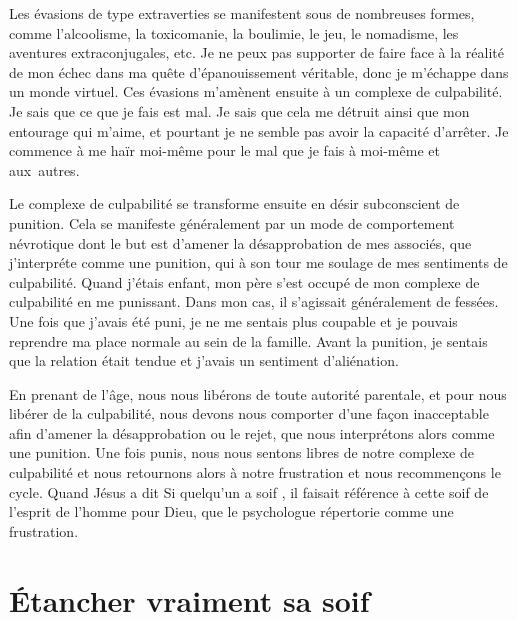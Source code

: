 Les évasions de type extraverties se manifestent sous de nombreuses formes,
 comme l'alcoolisme, la toxicomanie, la boulimie, le jeu, le nomadisme,
 les aventures extraconjugales, etc.
 Je ne peux pas supporter de faire face à la réalité de mon échec dans ma quête
 d'épanouissement véritable, donc je m'échappe dans un monde virtuel.
 Ces évasions m'amènent ensuite à un complexe de culpabilité.
 Je sais que ce que je fais est mal. Je sais que cela me détruit
 ainsi que mon entourage qui m'aime, et pourtant je ne semble pas avoir
 la capacité d'arrêter. Je commence à me haïr moi-même pour le mal que je fais
 à moi-même et aux~autres.

Le complexe de culpabilité se transforme ensuite en désir subconscient
 de punition. Cela se manifeste généralement par un mode de comportement
 névrotique dont le but est d'amener la désapprobation de mes associés,
 que j'interpréte comme une punition, qui à son tour me soulage
 de mes sentiments de culpabilité. Quand j'étais enfant, mon père
 s'est occupé de mon complexe de culpabilité en me punissant.
 Dans mon cas, il s'agissait généralement de fessées.
 Une fois que j'avais été puni, je ne me sentais plus coupable
 et je pouvais reprendre ma place normale au sein de la famille.
 Avant la punition, je sentais que la relation était tendue et j'avais
 un sentiment d'aliénation.

En prenant de l'âge, nous nous libérons de toute autorité parentale,
 et pour nous libérer de la culpabilité, nous devons
 nous comporter d'une façon inacceptable afin d'amener la désapprobation
 ou le rejet, que nous interprétons alors comme une punition.
 Une fois punis, nous nous sentons libres de notre complexe de culpabilité
 et nous retournons alors à notre frustration et nous recommençons le cycle.
 Quand Jésus a dit\frcolon{} \Og Si quelqu'un a soif \Fg{},
 il faisait référence à cette soif de l'esprit de l'homme pour Dieu,
 que le psychologue répertorie comme une frustration.
 \nowidow[6]


\section{\'Etancher vraiment sa soif}

